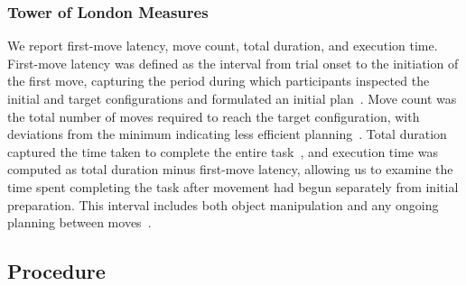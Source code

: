 \subsubsection{Tower of London Measures}
We report first-move latency, move count, total duration, and execution time. First-move latency was defined as the interval from trial onset to the initiation of the first move, capturing the period during which participants inspected the initial and target configurations and formulated an initial plan~\citep{shallice1982specific}. Move count was the total number of moves required to reach the target configuration, with deviations from the minimum indicating less efficient planning~\citep{kaller2012assessing}. Total duration captured the time taken to complete the entire task~\citep{kaller2012assessing}, and execution time was computed as total duration minus first-move latency, allowing us to examine the time spent completing the task after movement had begun separately from initial preparation. This interval includes both object manipulation and any ongoing planning between moves~\citep{jablonska2022age}.

\subsection{Procedure}

